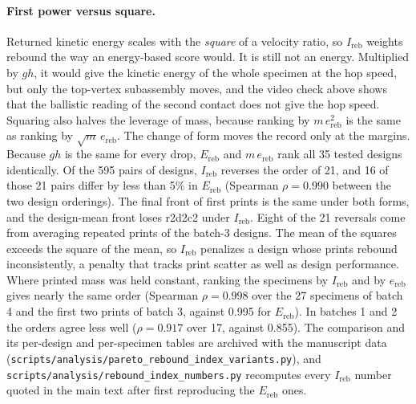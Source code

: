 \documentclass[11pt]{article}
\begin{document}
\paragraph{First power versus square.} Returned kinetic energy scales
with the \emph{square} of a velocity ratio, so $I_{\mathrm{reb}}$ weights
rebound the way an energy-based score would. It is still not an energy.
Multiplied by $g h$, it would give the kinetic energy of the whole
specimen at the hop speed, but only the top-vertex subassembly moves,
and the video check above shows that the ballistic reading of the
second contact does not give the hop speed. Squaring also halves the
leverage of mass, because ranking by $m\,e_{\mathrm{reb}}^2$ is the same
as ranking by $\sqrt{m}\,e_{\mathrm{reb}}$. The change of form moves the
record only at the margins. Because $g h$ is the same for every drop,
$E_{\mathrm{reb}}$ and $m\,e_{\mathrm{reb}}$ rank all 35 tested designs
identically. Of the 595 pairs of designs, $I_{\mathrm{reb}}$ reverses the
order of 21, and 16 of those 21 pairs differ by less than 5\% in
$E_{\mathrm{reb}}$ (Spearman $\rho = 0.990$ between the two design
orderings). The final front of first prints is the same under both
forms, and the design-mean front loses r2d2c2 under $I_{\mathrm{reb}}$.
Eight of the 21 reversals come from averaging repeated prints of the
batch-3 designs. The mean of the squares exceeds the square of the
mean, so $I_{\mathrm{reb}}$ penalizes a design whose prints rebound
inconsistently, a penalty that tracks print scatter as well as design
performance. Where printed mass was held constant, ranking the
specimens by $I_{\mathrm{reb}}$ and by $e_{\mathrm{reb}}$ gives nearly
the same order (Spearman $\rho = 0.998$ over the 27 specimens of batch 4
and the first two prints of batch 3, against 0.995 for
$E_{\mathrm{reb}}$). In batches 1 and 2 the orders
agree less well ($\rho = 0.917$ over 17, against 0.855). The comparison
and its per-design and per-specimen tables are archived with the
manuscript data
(\texttt{scripts/\allowbreak analysis/\allowbreak pareto\_rebound\_index\_variants.py}),
and \texttt{scripts/\allowbreak analysis/\allowbreak rebound\_index\_numbers.py}
recomputes every $I_{\mathrm{reb}}$ number quoted in the main text after
first reproducing the $E_{\mathrm{reb}}$ ones.

\end{document}
